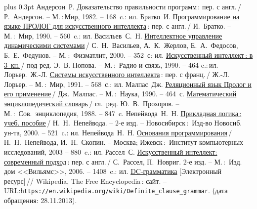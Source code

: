 \documentclass[14pt, openany, twoside, draft]{extbook} %
\def\emphbib#1{#1}
\begin{document}
\begin{thebibliography}{99}\itemsep1pt \parskip 0pt plus 0.3pt
 Андерсон~Р. \emphbib{Доказательство правильности программ}\,{}: пер. с англ.\,{}/ Р.~Андерсон. -- М.\,:\,Мир, 1982. -- 168~c.: ил.
 Братко~И. \emphbib{\href{http://royallib.ru/book/bratko_ivan/programmirovanie_na_yazike_prolog_dlya_iskusstvennogo_intellekta.html}{Программирование на языке ПРОЛОГ для искусственного интеллекта}}\,{}: пер. с англ.\,/ И.~Братко. -- М.\,:~Мир, 1990. -- 560~c.: ил.
 Васильев~С.~Н. \emphbib{\href{http://bookfi.org/book/616050}{Интеллектное управление динамическими системами}}\,{}/ С.~Н.~Васильев, А.~К.~Жерлов, Е.~А.~Федосов, Б.~Е.~Федунов. -- М.\,:~Физматлит, 2000. -- 352~с: ил.
 \emphbib{\href{http://aihandbook.intsys.org.ru/index.php/intro/ai-handbook}{Искусственный интеллект\,{}: в 3~кн.}}\,{}/ под ред. Э.~В. Попова. -- М.\,:~Радио и связь, 1990. -- 464 c.:\,{}ил.
 Лорьер.~Ж.-Л.  \emphbib{\href{http://publ.lib.ru/ARCHIVES/L/LOR'ER_Jan_Lui/_Lor'er_J.L..html}{Системы искусственного интеллекта}\,{}: пер. с франц.}\,{}/ Ж.-Л. Лорьер. -- М.\,:~Мир, 1991. -- 568~с.: ил.
 Малпас~Дж. \emphbib{\href{http://padaread.com/?book=40731&pg=1}{Реляционный язык Пролог и его применение}}\,{}/ Дж.~Малпас. -- М.\,:~Наука, 1990. -- 464~с.
 \emphbib{\href{https://app.box.com/shared/793ukgvblxmj0hh6btw4}{Математический энциклопедический словарь}}\,{}/ гл.~ред. Ю.~В.~Прохоров. -- М.\,:~Сов.~энциклопедия, 1988. -- 847~c.
 Непейвода~Н.~Н. \emphbib{\href{http://www.logic-books.info/taxonomy/term/215}{Прикладная логика\,{}: учеб. пособие}}\,{}/ Н.~Н.~Непейвода. -- 2-е изд. -- Новосибирск\,{}:~Изд-во Новосиб. ун-та, 2000. -- 521~c.: ил.
 Непейвода~Н.~Н.  \emphbib{\href{http://philosophy.ru/library/logic_math/library/nepeivoda_prog.pdf}{Основания программирования}}\,{}/ Н.~Н.~Непейвода, И.~Н.~Скопин. -- Москва; Ижевск\,{}:~Институт компьютерных исследований, 2003 -- 880~c.: ил.
 Рассел~С. \href{http://www.aiportal.ru/downloads/books/ai-modern-approach-2-edition-by-rassel-norvig.html}{Искусственный интеллект: современный подход}\,{}: пер. с англ.\,{}/ С.~Рассел, П.~Новриг. 2-е изд. -- М.\,:~Изд. дом <<Вильямс>>, 2006. -- 1408~c.: ил.
 \emphbib{\href{https://en.wikipedia.org/wiki/Definite_clause_grammar}{DC-грамматика}} [Электронный ресурс]\,{}// Wikipedia, The Free Encyclopedia\,{}: сайт. -- URL:\texttt{https://en.wikipedia.org/wiki/Definite\_clause\linebreak\_grammar}. (дата обращения: 28.11.2013).

\end{thebibliography}
\end{document}
